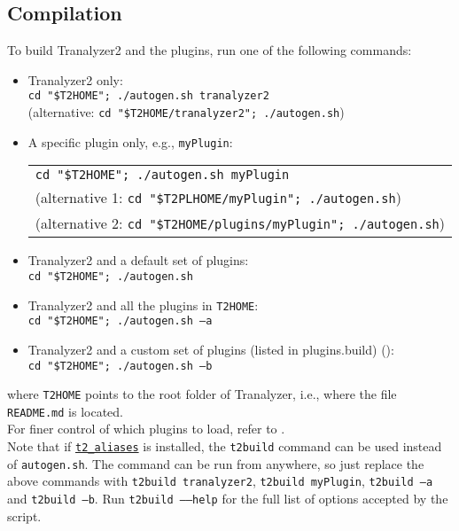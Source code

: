 \subsection{Compilation}\label{compile}
To build Tranalyzer2 and the plugins, run one of the following commands:

\begin{itemize}
    \item Tranalyzer2 only:\\
        {\tt cd "\$T2HOME"; ./autogen.sh tranalyzer2}\\
        (alternative: {\tt cd "\$T2HOME/tranalyzer2"; ./autogen.sh})
    \item A specific plugin only, e.g., {\tt myPlugin}:\\
        \begin{tabular}{l}
            {\tt cd "\$T2HOME"; ./autogen.sh myPlugin}\\
            (alternative 1: {\tt cd "\$T2PLHOME/myPlugin"; ./autogen.sh})\\
            (alternative 2: {\tt cd "\$T2HOME/plugins/myPlugin"; ./autogen.sh})
        \end{tabular}
    \item Tranalyzer2 and a default set of plugins:\\
        {\tt cd "\$T2HOME"; ./autogen.sh}
    \item Tranalyzer2 and all the plugins in {\tt T2HOME}:\\
        {\tt cd "\$T2HOME"; ./autogen.sh --a}
    \item Tranalyzer2 and a custom set of plugins (listed in plugins.build) ():\\
        {\tt cd "\$T2HOME"; ./autogen.sh --b}
\end{itemize}

where {\tt T2HOME} points to the root folder of Tranalyzer, i.e., where the file {\tt README.md} is located.\\

For finer control of which plugins to load, refer to
.\\

Note that if \hyperref[s:aliases]{\tt t2\_aliases} is installed, the {\tt t2build} command can be used instead of {\tt autogen.sh}.
The command can be run from anywhere, so just replace the above commands with
{\tt t2build tranalyzer2},
{\tt t2build myPlugin},
{\tt t2build --a} and {\tt t2build --b}.
Run {\tt t2build --{}--help} for the full list of options accepted by the script.

